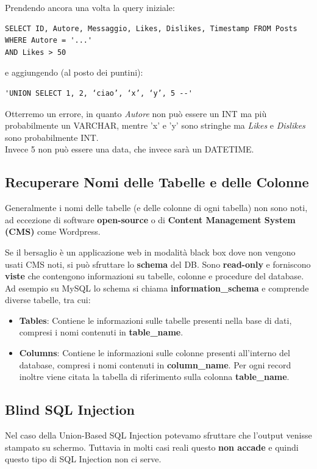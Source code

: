 \documentclass{article}
\begin{document}
Prendendo ancora una volta la query iniziale:
\begin{verbatim}
SELECT ID, Autore, Messaggio, Likes, Dislikes, Timestamp FROM Posts WHERE Autore = '...' 
AND Likes > 50  
\end{verbatim}
e aggiungendo (al posto dei puntini):
\begin{verbatim}
'UNION SELECT 1, 2, ‘ciao’, ‘x’, ‘y’, 5 --'
\end{verbatim}

Otterremo un errore, in quanto \textit{Autore} non può essere un INT ma più probabilmente un VARCHAR, mentre 'x' e 'y' sono stringhe ma \textit{Likes} e \textit{Dislikes} sono probabilmente INT.\\
Invece 5 non può essere una data, che invece sarà un DATETIME.

\newpage
\subsection{Recuperare Nomi delle Tabelle e delle Colonne}
Generalmente i nomi delle tabelle (e delle colonne di ogni tabella) non sono noti, ad eccezione di software \textbf{open-source} o di \textbf{Content Management System (CMS)} come Wordpress.

Se il bersaglio è un applicazione web in modalità black box dove non vengono usati CMS noti, si può sfruttare lo \textbf{schema} del DB. Sono \textbf{read-only} e forniscono \textbf{viste} che contengono informazioni su tabelle, colonne e procedure del database. Ad esempio su MySQL lo schema si chiama \textbf{information\_schema} e comprende diverse tabelle, tra cui:
\begin{itemize}
	\item \textbf{Tables}: Contiene le informazioni sulle tabelle presenti nella base di dati, compresi i nomi contenuti in \textbf{table\_name}.
	
	\item \textbf{Columns}: Contiene le informazioni sulle
	colonne	presenti all'interno del database, compresi i nomi contenuti in \textbf{column\_name}. Per ogni record inoltre viene citata la tabella di riferimento sulla colonna
	\textbf{table\_name}.
\end{itemize}

\subsection{Blind SQL Injection}
Nel caso della Union-Based SQL Injection potevamo sfruttare che l'output venisse stampato su schermo. Tuttavia in molti casi reali questo \textbf{non accade} e quindi questo tipo di SQL Injection non ci serve.
\end{document}
